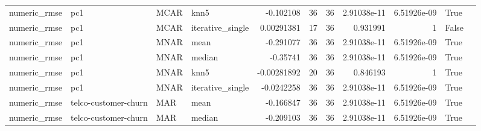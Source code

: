 \begin{table}[ht]
\begin{tabular}{llllrrrrrll}
 numeric\_rmse           & pc1                  & MCAR        & knn5             &     -0.102108    &                  36 &      36 & 2.91038e-11 & 6.51926e-09 & True               &                                                                                                                    \\
 numeric\_rmse           & pc1                  & MCAR        & iterative\_single &      0.00291381  &                  17 &      36 & 0.931991    & 1           & False              &                                                                                                                    \\
 numeric\_rmse           & pc1                  & MNAR        & mean             &     -0.291077    &                  36 &      36 & 2.91038e-11 & 6.51926e-09 & True               &                                                                                                                    \\
 numeric\_rmse           & pc1                  & MNAR        & median           &     -0.35741     &                  36 &      36 & 2.91038e-11 & 6.51926e-09 & True               &                                                                                                                    \\
 numeric\_rmse           & pc1                  & MNAR        & knn5             &     -0.00281892  &                  20 &      36 & 0.846193    & 1           & True               &                                                                                                                    \\
 numeric\_rmse           & pc1                  & MNAR        & iterative\_single &     -0.0242258   &                  36 &      36 & 2.91038e-11 & 6.51926e-09 & True               &                                                                                                                    \\
 numeric\_rmse           & telco-customer-churn & MAR         & mean             &     -0.166847    &                  36 &      36 & 2.91038e-11 & 6.51926e-09 & True               &                                                                                                                    \\
 numeric\_rmse           & telco-customer-churn & MAR         & median           &     -0.209103    &                  36 &      36 & 2.91038e-11 & 6.51926e-09 & True               &                                                                                                                    \\

\end{tabular}
\end{table}
